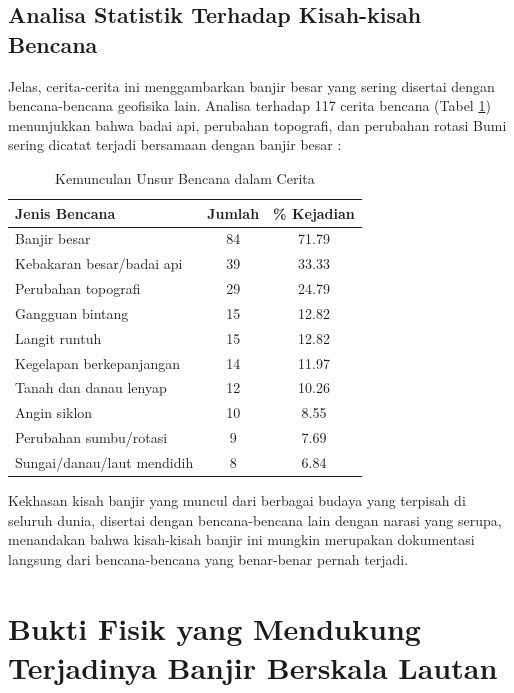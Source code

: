 \documentclass[10pt,twocolumn,letterpaper]{article}
\begin{document}
\subsection{Analisa Statistik Terhadap Kisah-kisah Bencana}

Jelas, cerita-cerita ini menggambarkan banjir besar yang sering disertai dengan bencana-bencana geofisika lain. Analisa terhadap 117 cerita bencana (Tabel \ref{tab: 1}) menunjukkan bahwa badai api, perubahan topografi, dan perubahan rotasi Bumi sering dicatat terjadi bersamaan dengan banjir besar \cite{14}:

\begin{table}[ht]
\begin{center}
\renewcommand{\arraystretch}{1.2}  %
\begin{tabular}{|l|c|c|}
\hline
\textbf{Jenis Bencana} & \textbf{Jumlah} & \textbf{\% Kejadian} \\
\hline\hline
Banjir besar            & 84 & 71.79 \\
Kebakaran besar/badai api & 39 & 33.33 \\
Perubahan topografi   & 29 & 24.79 \\
Gangguan bintang     & 15 & 12.82 \\
Langit runtuh           & 15 & 12.82 \\
Kegelapan berkepanjangan      & 14 & 11.97 \\
Tanah dan danau lenyap    & 12 & 10.26 \\
Angin siklon            & 10 & 8.55  \\
Perubahan sumbu/rotasi & 9 & 7.69  \\
Sungai/danau/laut mendidih & 8 & 6.84 \\
\hline
\end{tabular}
\end{center}
\caption{Kemunculan Unsur Bencana dalam Cerita}
\label{tab: 1}
\end{table}

Kekhasan kisah banjir yang muncul dari berbagai budaya yang terpisah di seluruh dunia, disertai dengan bencana-bencana lain dengan narasi yang serupa, menandakan bahwa kisah-kisah banjir ini mungkin merupakan dokumentasi langsung dari bencana-bencana yang benar-benar pernah terjadi.

\section{Bukti Fisik yang Mendukung Terjadinya Banjir Berskala Lautan}
\end{document}
